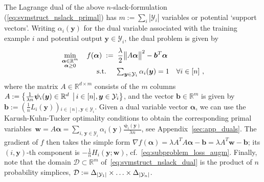 \documentclass[twoside,11pt]{article}
\newcommand{\comment}[1]{}
\newcommand{\av}{\bm{\alpha}}
\newcommand{\simplex}{\Delta}
\newcommand{\R}{\mathbb{R}}
\newcommand{\norm}[1]{\left\lVert#1\right\rVert}
\newcommand\SetOf[2]{\left\{#1\,\vphantom{#2}\right.\left|\vphantom{#1}\,#2\right\}}
\newcommand{\0}{\mathbf{0}} %
\newcommand{\bv}{\bm{b}}
\newcommand{\outputvar}{y}
\newcommand{\outputvarv}{\bm{\outputvar}}
\newcommand{\outputdomain}{\mathcal{Y}}
\newcommand{\featuremapdiff}{\psi}
\newcommand{\featuremapdiffv}{\bm{\featuremapdiff}}
\newcommand{\errorterm}{L}
\newcommand{\weight}{w}
\newcommand{\wv}{{\bm{\weight}}}
\newcommand{\dualvar}{\alpha}
\newcommand{\dualvarv}{\bm{\alpha}}
\newcommand{\domain}{\mathcal{D}} %
\begin{document}
The Lagrange dual of the above $n$-slack-formulation (\ref{eq:svmstruct_nslack_primal}) has $m := \sum_i |\outputdomain_i|$ variables or potential `support vectors'.
Writing $\dualvar_i(\outputvarv)$ for the dual variable associated with the training example $i$ and potential output $\outputvarv \in \outputdomain_i$, the dual problem is given by
\begin{align}
    \label{eq:svmstruct_nslack_dual} %
    \min_{\substack{ \dualvarv\in\R^{m} \\  \dualvarv \geq 0}} \quad  f(\dualvarv) \;:=&  \;\;
    \frac{\lambda}{2}
    \big\| A\dualvarv \big\|^2
    - \bv^T\dualvarv
    \\[-2mm]
    \text{s.t.} \quad &  \;
      \textstyle\sum_{\outputvarv \in \outputdomain_i}  \dualvar_i(\outputvarv) = 1 ~~~\forall i\in[n] \ , \notag 
\end{align}
where the matrix $A\in\R^{d\times m}$ consists of the $m$ columns $A := \SetOf{\frac1{\lambda n} \featuremapdiffv_i(\outputvarv) \in\R^d}{i\in[n],\outputvarv \in \outputdomain_i}$, and the vector $\bv \in \R^m$ is given by 
$\bv:= \left(\frac1n \errorterm_i(\outputvarv) \right)$$_{i\in[n],\outputvarv\in\outputdomain_i}$. %
Given a dual variable vector $\dualvarv$, we can use the Karush-Kuhn-Tucker optimality conditions  to obtain the corresponding primal variables~$
\wv = A\dualvarv  = \sum_{i,\,\outputvarv \in \outputdomain_i} \dualvar_i(\outputvarv)  \frac{\featuremapdiffv_i(\outputvarv)}{\lambda n}
$, see Appendix~\ref{sec:app_duals}.
The gradient of $f$ then takes the simple form $\nabla f(\dualvarv) = \lambda A^TA\dualvarv - \bv = \lambda A^T\wv - \bv$; its \mbox{$(i,\outputvarv)$-th} component is $-\frac{1}{n} H_i(\outputvarv; \wv)$, cf.~\eqref{eq:subproblem_loss_augm}. 
Finally, note that the domain $\domain \subset \R^m$ of~\eqref{eq:svmstruct_nslack_dual} is the product of $n$ probability simplices, $\domain := \simplex_{|\outputdomain_1|}\times\mathellipsis\times\simplex_{|\outputdomain_n|}$.

\comment{
This approach exploits the associated conjugate \emph{dual} problem of \eqref{eq:sdcaPrimal} defined over one dual variable per each example in
the training set.
\begin{equation}
    \label{eq:sdcaDual}
    \max_{\av \in \R^n} \quad \Big[ \ 
    D(\av) := - \frac{\lambda}{2} \norm{ A\av }^2
    - \frac1n \sum_{i=1}^n \ell_i^*(-\alpha_i) \ \Big],
\end{equation}
where $\ell_i^*$ is the conjugate (Fenchel dual) of the loss function
$\ell_i$%
, and the data matrix $A\in\R^{d\times n}$ collects the (normalized) data
examples $A_i := \frac{1}{\lambda n} X^i$ in its columns. The duality comes with the convenient mapping from dual to primal variables
$\wv(\av) := A\av$ as given by the optimality
conditions~\cite{ShalevShwartz:2013wl}.
For any configuration of the dual variables $\av$, we have the duality gap
defined as $P(\wv(\av)) - D(\av)$. This gap is a computable certificate of
the approximation quality to the unknown true optimum $P(\wv^*) = D(\av^*)$,
and therefore serves as a useful stopping criteria as well as a way to automatically set the stepsize. We refer the reader to~\cite{Jaggi:2014vi} for further details.
}
\end{document}
